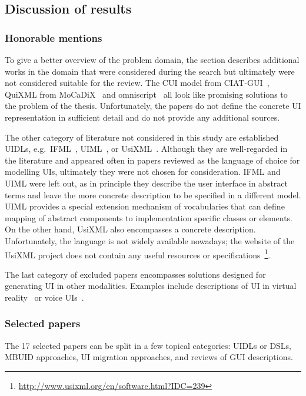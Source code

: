 \subsection{Discussion of results}\label{subsec:discussion-of-results}

\subsubsection{Honorable mentions}
To give a better overview of the problem domain, the section describes additional works in the domain that were considered during the search but ultimately were not considered suitable for the review.
The CUI model from CIAT-GUI~\cite{Molina2012-my}, QuiXML from MoCaDiX~\cite{Vanderdonckt2019-av} and omniscript~\cite{Ulusoy2019-jh} all look like promising solutions to the problem of the thesis.
Unfortunately, the papers do not define the concrete UI representation in sufficient detail and do not provide any additional sources.

The other category of literature not considered in this study are established UIDLs, e.g.\ IFML~\cite{Brambilla2014-ln}, UIML~\cite{Abrams1999}, or UsiXML~\cite{Limbourg2005}.
Although they are well-regarded in the literature and appeared often in papers reviewed as the language of choice for modelling UIs, ultimately they were not chosen for consideration.
IFML and UIML were left out, as in principle they describe the user interface in abstract terms and leave the more concrete description to be specified in a different model.
UIML provides a special extension mechanism of vocabularies that can define mapping of abstract components to implementation specific classes or elements.
On the other hand, UsiXML also encompasses a concrete description.
Unfortunately, the language is not widely available nowadays;
the website of the UsiXML project does not contain any useful resources or specifications~\footnote{\url{http://www.usixml.org/en/software.html?IDC=239}}.

The last category of excluded papers encompasses solutions designed for generating UI in other modalities.
Examples include descriptions of UI in virtual reality~\cite{Olmedo2015} or voice UIs~\cite{steinberger2020domain}.

\subsubsection{Selected papers}

The 17 selected papers can be split in a few topical categories: UIDLs or DSLs, MBUID approaches, UI migration approaches, and reviews of GUI descriptions.

